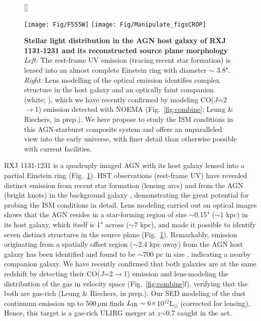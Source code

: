 \documentclass[12pt,a4paper]{article}  %
\newcommand{\Lsun}{\mbox{L$_{\odot}$}\xspace}
\newcommand{\rarr}{$\rightarrow$}
\newcommand{\bco}{\mbox{CO($J$=2\rarr1)}\xspace}
\newcommand{\rot}[3][HCN]{\mbox{#1($J$=#2\rarr#3)}\xspace}
\newcommand{\Fig}[1]{Fig.~\ref{fig:#1}}
\begin{document}
\begin{figure}[!tbhp]
\centering
{}[\FBwidth]
{
\hspace{-0.35em}
\vspace*{-0.55em}
\caption{ \fontsize{10pt}{12pt}\selectfont 
{
\textbf{Stellar light distribution in the AGN host galaxy of RXJ 1131-1231 and its reconstructed source plane
morphology}
{\em Left:} The rest-frame UV emission (tracing recent star formation) 
is lensed into an almost complete Einstein ring with diameter $\sim$ 3.8". 
{\em Right:} Lens modelling of the optical emission identifies complex structure in the host galaxy and
an optically faint companion (white; \citealt{Claeskens06a}), 
which we have recently confirmed by modeling \bco emission detected with NOEMA
(\Fig{combine}; Leung \& Riechers, in prep.). 
We here propose to study
the ISM conditions in this AGN-starburst composite system and offers an unparalleled
view into the early universe, with finer
detail than otherwise possible with current facilities. 
}
\label{fig:HST}}}
{\hspace{-1em}
\texttt{[image: Fig/F555W]}
\hspace{-1.5em}
\texttt{[image: Fig/Manipulate\_figsCROP]}
\vspace{-1em}
}
\end{figure}

RXJ 1131-1231 is a quadruply imaged AGN with its host galaxy lensed 
into a partial Einstein ring (\Fig{HST}). 
HST observations (rest-frame UV) have revealed distinct emission 
from recent star formation (lensing arcs) and from the AGN (bright knots) in the background galaxy \citep{Sluse03a},
demonstrating the great potential for probing the 
ISM conditions in detail. Lens modeling carried out on optical images shows
that the AGN resides in a star-forming region of size $\sim$0.15" ($\sim$1 kpc)
in its host galaxy, which itself is 1" across ($\sim$7 kpc), and made it possible to identify
seven distinct structures in the source plane (\Fig{HST}). Remarkably, emission originating from 
a spatially offset region ($\sim$2.4 kpc away) from the AGN host galaxy has been identified and found 
to be $\sim$700 pc in size \citep{Brewer08a}, indicating a nearby companion galaxy. 
We have recently confirmed that both galaxies are at the same redshift by detecting their 
\rot[CO]{2}{1} emission and lens-modeling the distribution of the gas in velocity space (\Fig{combine}f), 
verifying that the both are gas-rich (Leung \& Riechers, in prep.). 
Our SED modeling of the dust continuum emission up to 500\,$\mu$m finds $L_{\rm IR}\sim6\times$10$^{12}$\Lsun 
(corrected for lensing). Hence, this target is a gas-rich ULIRG merger at $z$$\sim$0.7 caught in the act. 
\end{document}
